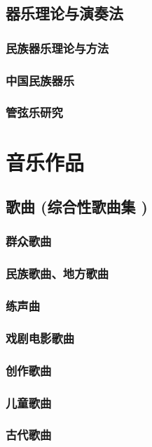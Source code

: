 \documentclass[UTF8]{../RepresentationUniverse}
\begin{document}
    \subsection{器乐理论与演奏法}
        \subsubsection{民族器乐理论与方法}
        \subsubsection{中国民族器乐}
        \subsubsection{管弦乐研究}



\section{音乐作品}
    \subsection{歌曲 (综合性歌曲集 )}
        \subsubsection{群众歌曲}
        \subsubsection{民族歌曲、地方歌曲}
        \subsubsection{练声曲}
        \subsubsection{戏剧电影歌曲}
        \subsubsection{创作歌曲}
        \subsubsection{儿童歌曲}
        \subsubsection{古代歌曲}
\end{document}
